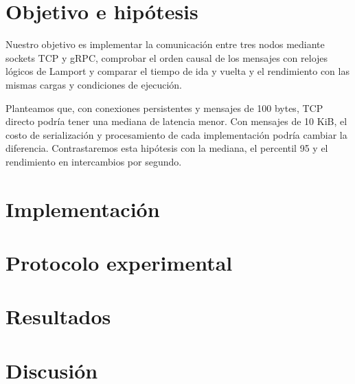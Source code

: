 \documentclass[11pt,a4paper]{article}
\begin{document}


\section{Objetivo e hipótesis}
Nuestro objetivo es implementar la comunicación entre tres nodos mediante
sockets TCP y gRPC, comprobar el orden causal de los mensajes con relojes
lógicos de Lamport y comparar el tiempo de ida y vuelta y el rendimiento con
las mismas cargas y condiciones de ejecución.

Planteamos que, con conexiones persistentes y mensajes de 100 bytes, TCP
directo podría tener una mediana de latencia menor. Con mensajes de 10 KiB,
el costo de serialización y procesamiento de cada implementación podría
cambiar la diferencia. Contrastaremos esta hipótesis con la mediana, el
percentil 95 y el rendimiento en intercambios por segundo.


\section{Implementación}



\section{Protocolo experimental}


\section{Resultados}


\section{Discusión}








\printbibliography
\end{document}
